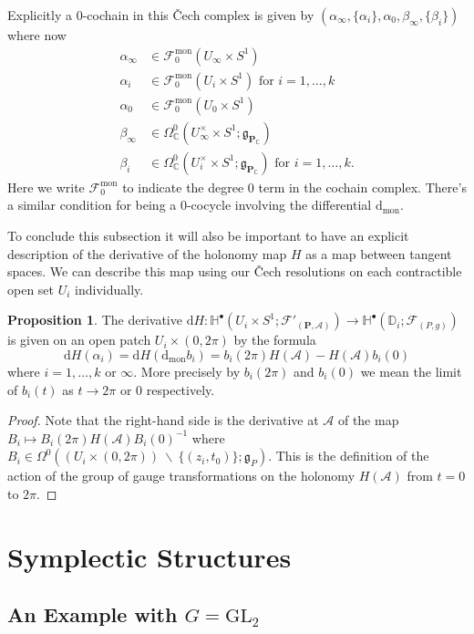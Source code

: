 \documentclass[11pt, oneside, reqno]{amsart}
\theoremstyle{definition} \newtheorem{definition}{Definition}[section]
\newtheorem{prop}[definition]{Proposition}
\theoremstyle{definition} \newtheorem{remark}[definition]{Remark}
\theoremstyle{definition} \newtheorem{remarks}[definition]{Remarks}
\theoremstyle{definition} \newtheorem{question}[definition]{Question}
\theoremstyle{definition} \newtheorem*{note}{Note}
\theoremstyle{definition} \newtheorem{example}[definition]{Example}
\theoremstyle{definition} \newtheorem{examples}[definition]{Examples}
\renewcommand{\gg}{\mathfrak{g}}
\newcommand{\bb}[1]{\mathbb{#1}}
\newcommand{\mr}[1]{\mathrm{#1}}
\newcommand{\mc}[1]{\mathcal{#1}}
\newcommand{\bo}[1]{\boldsymbol{#1}}
\newcommand{\bs}{\ \backslash \ }
\newcommand{\CC}{\mathbb{C}}
\newcommand{\GL}{\mathrm{GL}}
\renewcommand{\d}{\mathrm{d}}
\begin{document}
Explicitly a 0-cochain in this \v Cech complex is given by $(\alpha_\infty, \{\alpha_i\}, \alpha_0, \beta_\infty, \{\beta_i\})$ where now 
\begin{align*}
 \alpha_\infty &\in \mc F^{\mr{mon}}_0(U_\infty \times S^1) \\
 \alpha_i &\in \mc F^{\mr{mon}}_0(U_i\times S^1) \text{ for } i = 1,\ldots,k \\
 \alpha_0 &\in \mc F^{\mr{mon}}_0(U_0\times S^1) \\
 \beta_\infty &\in \Omega^0_\CC(U_\infty^\times \times S^1; \gg_{\bo P_\CC}) \\
 \beta_i &\in \Omega^0_\CC(U_i^\times \times S^1; \gg_{\bo P_\CC}) \text{ for } i=1,\ldots,k.
\end{align*}
Here we write $\mc F^{\mr{mon}}_0$ to indicate the degree 0 term in the cochain complex.  There's a similar condition for being a 0-cocycle involving the differential $\d_{\mr{mon}}$. 

To conclude this subsection it will also be important to have an explicit description of the derivative of the holonomy map $H$ as a map between tangent spaces.  We can describe this map using our \v Cech resolutions on each contractible open set $U_i$ individually.

\begin{prop} \label{local_derivative_description_prop}
The derivative $\d H \colon \bb H^\bullet(U_i \times S^1 ; \mc F'_{(\bo P,\mc A)}) \to \bb H^\bullet(\bb D_i; \mc F_{(P,g)})$ is given on an open patch $U_i \times (0,2\pi)$ by the formula
\[\d H(\alpha_i) = \d H(\d_{\mr{mon}} b_i) = b_i(2\pi)H(\mc A) - H(\mc A)b_i(0)\]
where $i = 1, \ldots, k$ or $\infty$.  More precisely by $b_i(2\pi)$ and $b_i(0)$ we mean the limit of $b_i(t)$ as $t \to 2\pi$ or 0 respectively.
\end{prop}

\begin{proof}
Note that the right-hand side is the derivative at $\mc A$ of the map $B_i \mapsto B_i(2\pi)H(\mc A)B_i(0)^{-1}$ where $B_i \in \Omega^0((U_i \times (0,2\pi)) \bs \{(z_i, t_0)\}; \gg_P)$.  This is the definition of the action of the group of gauge transformations on the holonomy $H(\mc A)$ from $t=0$ to $2\pi$.
\end{proof}

\section{Symplectic Structures} \label{symp_section}
\subsection{An Example with $G=\GL_2$} \label{GL2_example_section}
\end{document}
